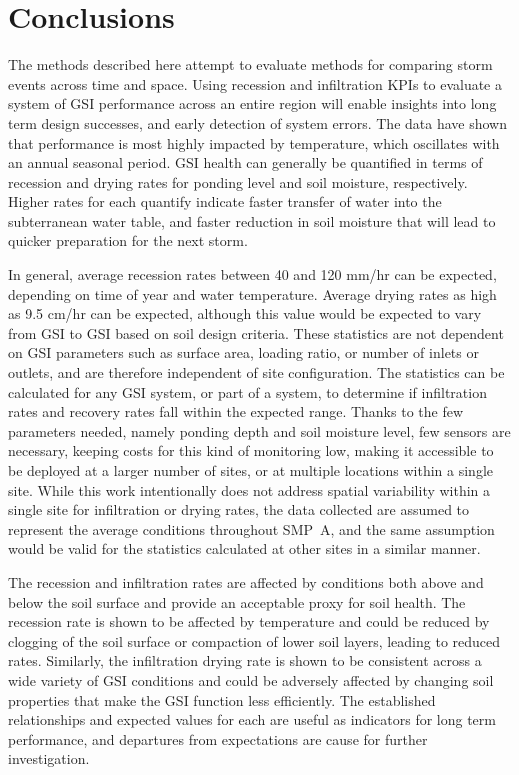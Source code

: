 \section{Conclusions}
The methods described here attempt to evaluate methods for comparing storm events across time and space.
Using recession and infiltration KPIs to evaluate a system of GSI performance across an entire region will enable insights into long term design successes, and early detection of system errors.
The data have shown that performance is most highly impacted by temperature, which oscillates with an annual seasonal period.
GSI health can generally be quantified in terms of recession and drying rates for ponding level and soil moisture, respectively.
Higher rates for each quantify indicate faster transfer of water into the subterranean water table, and faster reduction in soil moisture that will lead to quicker preparation for the next storm.

In general, average recession rates between 40 and 120 mm/hr can be expected, depending on time of year and water temperature.
Average drying rates as high as 9.5 cm/hr can be expected, although this value would be expected to vary from GSI to GSI based on soil design criteria.
These statistics are not dependent on GSI parameters such as surface area, loading ratio, or number of inlets or outlets, and are therefore independent of site configuration.
The statistics can be calculated for any GSI system, or part of a system, to determine if infiltration rates and recovery rates fall within the expected range.
Thanks to the few parameters needed, namely ponding depth and soil moisture level, few sensors are necessary, keeping costs for this kind of monitoring low, making it accessible to be deployed at a larger number of sites, or at multiple locations within a single site.
While this work intentionally does not address spatial variability within a single site for infiltration or drying rates, the data collected are assumed to represent the average conditions throughout SMP~A, and the same assumption would be valid for the statistics calculated at other sites in a similar manner.

The recession and infiltration rates are affected by conditions both above and below the soil surface and provide an acceptable proxy for soil health.
The recession rate is shown to be affected by temperature and could be reduced by clogging of the soil surface or compaction of lower soil layers, leading to reduced rates.
Similarly, the infiltration drying rate is shown to be consistent across a wide variety of GSI conditions and could be adversely affected by changing soil properties that make the GSI function less efficiently.
The established relationships and expected values for each are useful as indicators for long term performance, and departures from expectations are cause for further investigation.

